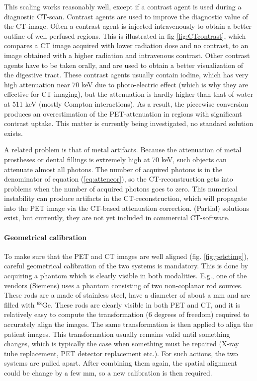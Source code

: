\documentclass[11pt,oneside]{article}
\begin{document}
This scaling works reasonably well, except if a contrast agent is used
during a diagnostic CT-scan. Contrast agents are used to improve the
diagnostic value of the CT-image. Often a contrast agent is injected
intravenously to obtain a better outline of well perfused
regions. This is illustrated in fig \ref{fig:CTcontrast}, which
compares a CT image acquired with lower radiation dose and no
contrast, to an image obtained with a higher radiation and intravenous
contrast. Other contrast agents have to be taken orally, and are used
to obtain a better visualization of the digestive tract. These
contrast agents usually contain iodine, which has very high
attenuation near 70 keV due to photo-electric effect (which is why
they are effective for CT-imaging), but the attenuation is hardly
higher than that of water at 511 keV (mostly Compton interactions). As
a result, the piecewise conversion produces an overestimation of the
PET-attenuation in regions with significant contrast uptake. This
matter is currently being investigated, no standard solution exists.

A related problem is that of metal artifacts. Because the attenuation
of metal prostheses or dental fillings is extremely high at 70 keV,
such objects can attenuate almost all photons. The number of acquired
photons is in the denominator of equation (\ref{eq:attencor}), so the
CT-reconstruction gets into problems when the number of acquired
photons goes to zero. This numerical instability can produce artifacts
in the CT-reconstruction, which will propagate into the PET image via
the CT-based attenuation correction. (Partial) solutions exist, but
currently, they are not yet included in commercial CT-software.

\paragraph{Geometrical calibration}
To make sure that the PET and CT images are well aligned
(fig. \ref{fig:petctimg}), careful geometrical calibration of the two
systems is mandatory. This is done by acquiring a phantom which is
clearly visible in both modalities. E.g., one of the vendors (Siemens)
uses a phantom consisting of two non-coplanar rod sources. These rods
are a made of stainless steel, have a diameter of about a mm and are
filled with $^{68}$Ge. These rods are clearly visible in both PET and
CT, and it is relatively easy to compute the transformation (6 degrees
of freedom) required to accurately align the images. The same
transformation is then applied to align the patient images. This
transformation usually remains valid until something changes, which is
typically the case when something must be repaired (X-ray tube
replacement, PET detector replacement etc.). For such actions, the two
systems are pulled apart. After combining them again, the spatial
alignment could be change by a few mm, so a new calibration is then
required.
\end{document}
